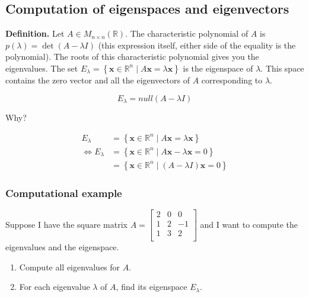 \documentclass[
]{article}
\newcounter{example}
\begin{document}
\subsection{Computation of eigenspaces and
eigenvectors}

\textbf{Definition.} Let
$A \in M_{n \times n}\left( \mathbb{R} \right)$. The characteristic
polynomial of $A$ is $p(\lambda) = \det(A - \lambda I)$ (this
expression itself, either side of the equality is the polynomial). The
roots of this characteristic polynomial gives you the eigenvalues. The
set
$E_{\lambda} = \left\{ \mathbf{x} \in \mathbb{R}^{n}\mid A\mathbf{x} = \lambda\mathbf{x} \right\}$
is the eigenspace of $\lambda$. This space contains the zero vector
and all the eigenvectors of $A$ corresponding to $\lambda$.

$$E_{\lambda} = null(A - \lambda I)$$

Why?

\begin{align*}
E_{\lambda} &= \left\{ \mathbf{x} \in \mathbb{R}^{n}\mid A\mathbf{x} = \lambda\mathbf{x} \right\}
 \\
\Leftrightarrow E_{\lambda} &= \left\{ \mathbf{x} \in \mathbb{R}^{n}\mid A\mathbf{x} - \lambda\mathbf{x} = 0 \right\}
 \\
&= \left\{ \mathbf{x} \in \mathbb{R}^{n}\mid(A - \lambda I)\mathbf{x} = 0 \right\}
\end{align*}



\subsubsection{Computational example}

Suppose I have the square matrix $A = \begin{bmatrix}
2 & 0 & 0 \\
1 & 2 & - 1 \\
1 & 3 & 2 \\
\end{bmatrix}$ and I want to compute the eigenvalues and the
eigenspace.

\begin{enumerate}
\def\labelenumi{\arabic{enumi}.}
\item
  Compute all eigenvalues for $A$.
\item
  For each eigenvalue $\lambda$ of $A$, find its eigenspace
  $E_{\lambda}$.
\end{enumerate}
\end{document}
